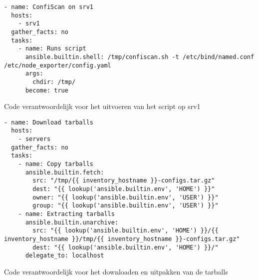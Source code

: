 \begin{listing}
  \begin{verbatim}
- name: ConfiScan on srv1
  hosts:
    - srv1
  gather_facts: no
  tasks:
    - name: Runs script
      ansible.builtin.shell: /tmp/confiscan.sh -t /etc/bind/named.conf /etc/node_exporter/config.yaml
      args:
        chdir: /tmp/
      become: true
    \end{verbatim}
    \caption{Code verantwoordelijk voor het uitvoeren van het script op srv1}
    \label{lst:bijlage-run-script}
\end{listing}

\begin{listing}
  \begin{verbatim}
- name: Download tarballs
  hosts:
    - servers
  gather_facts: no
  tasks:
    - name: Copy tarballs
      ansible.builtin.fetch:
        src: "/tmp/{{ inventory_hostname }}-configs.tar.gz"
        dest: "{{ lookup('ansible.builtin.env', 'HOME') }}"
        owner: "{{ lookup('ansible.builtin.env', 'USER') }}"
        group: "{{ lookup('ansible.builtin.env', 'USER') }}"
    - name: Extracting tarballs
      ansible.builtin.unarchive:
        src: "{{ lookup('ansible.builtin.env', 'HOME') }}/{{ inventory_hostname }}/tmp/{{ inventory_hostname }}-configs.tar.gz"
        dest: "{{ lookup('ansible.builtin.env', 'HOME') }}/"
      delegate_to: localhost
  \end{verbatim}
  \caption{Code verantwoordelijk voor het downloaden en uitpakken van de tarballs}
  \label{lst:bijlage-tarballs}
\end{listing}
